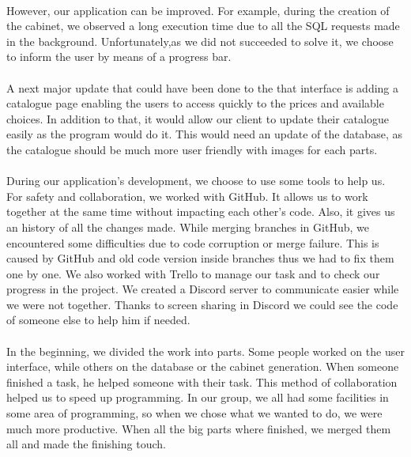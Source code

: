 \documentclass[12pt,oneside]{report}
\begin{document}
    \paragraph{}
    However, our application can be improved. For example, during the creation of the cabinet, we observed a long execution time due to all the SQL requests made in the background. Unfortunately,as we did not succeeded to solve it, we choose to inform the user by means of a progress bar.
    
    \paragraph{}
    A next major update that could have been done to the that interface is adding a catalogue page enabling the users to access quickly to the prices and available choices. In addition to that, it would allow our client to update their catalogue easily as the program would do it. This would need an update of the database, as the catalogue should be much more user friendly with images for each parts.
    
    \paragraph{}
    During our application's development, we choose to use some tools to help us. For safety and collaboration, we worked with GitHub. It allows us to work together at the same time without impacting each other's code. Also, it gives us an history of all the changes made.  While merging branches in GitHub, we encountered some difficulties due to code corruption or merge failure. This is caused by GitHub and old code version inside branches thus we had to fix them one by one.
    We also worked with Trello to manage our task and to check our progress in the project. We created a Discord server to communicate easier while we were not together. Thanks to screen sharing in Discord we could see the code of someone else to help him if needed.
    
    \paragraph{}
    In the beginning, we divided the work into parts. Some people worked on the user interface, while others on the database or the cabinet generation. When someone finished a task, he helped someone with their task. This method of collaboration helped us to speed up programming. In our group, we all had some facilities in some area of programming, so when we chose what we wanted to do, we were much more productive. When all the big parts where finished, we merged them all and made the finishing touch.
    
\end{document}
